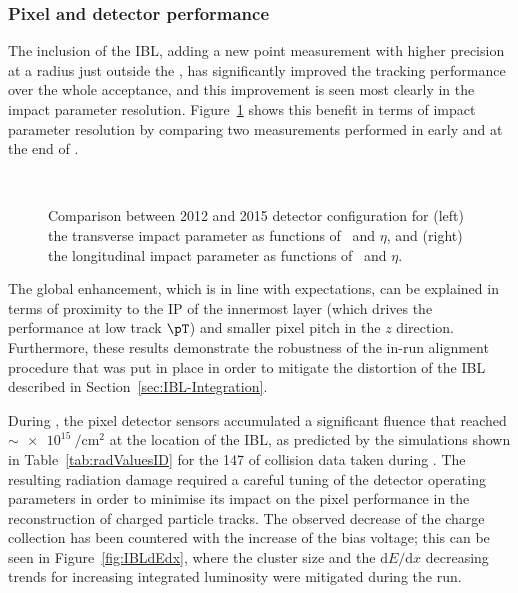 \documentclass[cernpreprint, atlasdraft=false, UKenglish,british,orcidlogo, texmf, orcidlogo]{atlasdoc}
\begin{document}
\subsubsection{Pixel and  detector performance}
\label{sss:pixIblPerf}
The inclusion of the \gls{IBL}, adding a new point measurement with higher precision at a radius just outside the \beampipe, has significantly improved the tracking performance over the whole acceptance, and this improvement is seen most clearly in the impact parameter resolution.
Figure~\ref{fig:tracking} shows this benefit in terms of impact parameter resolution by comparing two measurements
performed in early \RunTwo and at the end of \RunOne.
 
\begin{figure}[ht!]
\begin{center}
\\
\caption{Comparison between 2012 \RunOne and 2015 \RunTwo detector
configuration for
(left) the transverse impact parameter as functions of \protect{} \pT\ and \protect{} $\eta$, and (right) the longitudinal impact parameter as functions of \protect{} \pT\ and \protect{} $\eta$.
}
\label{fig:tracking}
\end{center}
\end{figure}
 
The global enhancement, which is in line with expectations, can be explained in terms of proximity to the \gls{IP} of the innermost layer (which drives the performance at low track $\pT$) and smaller pixel pitch in the $z$ direction.
Furthermore, these results demonstrate the robustness of the in-run alignment procedure that was put in place in order to mitigate the distortion of the \gls{IBL} described in Section~\ref{sec:IBL-Integration}.
 
During \RunTwo, the pixel detector sensors accumulated a significant fluence that reached
\phieqv $\sim \SI{e15}{\per\cm\squared}$
at the location of the \gls{IBL}, as predicted by the simulations shown in Table~\ref{tab:radValuesID} for the \SI{147}{\ifb} of \pp collision data taken during \RunTwo.
The resulting radiation damage required a careful tuning of the detector operating parameters in order to minimise its impact on the pixel performance in the reconstruction of charged particle tracks. The observed decrease of the charge collection has been countered with the increase of the bias voltage; this can be seen in Figure~\ref{fig:IBLdEdx}, where the cluster size and the ${\text{d}}E/{\text{d}}x$ decreasing trends for increasing integrated luminosity were mitigated during the run.
 
\end{document}
